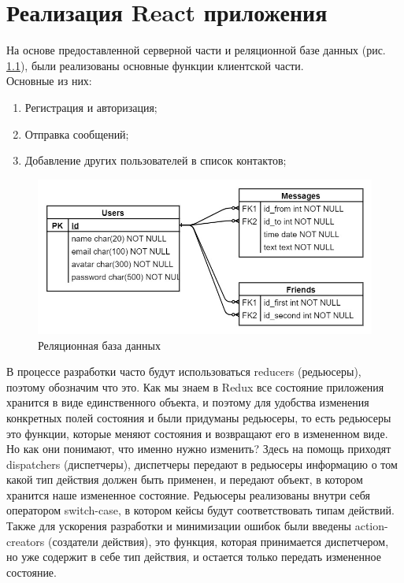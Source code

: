 \documentclass[14pt,final]{report}
\begin{document}
\chapter{Реализация React приложения}

На основе предоставленной серверной части и реляционной базе данных (рис. \ref{database}), были реализованы основные функции клиентской части. \\
Основные из них:
\begin{enumerate}
    \item Регистрация и авторизация;
    \item Отправка сообщений;
    \item Добавление других пользователей в список контактов;
\end{enumerate}

\begin{figure}[h]
\centering
\includegraphics[scale=0.4 ]{5CzTRFz5alk.jpg}
\caption{Реляционная база данных}
\label{database}
\end{figure}
В процессе разработки часто будут использоваться reducers \cite{mardan} (редьюсеры), поэтому обозначим
что это. Как мы знаем в Redux все состояние приложения хранится в виде единственного объекта, и поэтому для удобства изменения конкретных полей состояния и были придуманы редьюсеры, то есть редьюсеры это функции, которые меняют состояния и возвращают его в измененном виде. Но как они понимают, что именно нужно изменить? Здесь на помощь приходят dispatchers (диспетчеры), диспетчеры передают в редьюсеры информацию о том какой тип действия должен быть применен, и передают объект, в котором хранится наше измененное состояние. Редьюсеры реализованы внутри себя оператором switch-case, в котором кейсы будут соответствовать
типам действий. Также для ускорения разработки и минимизации ошибок были введены action-creators (создатели действия), это функция, которая принимается диспетчером, но уже содержит в себе тип действия, и остается только передать измененное состояние. \\
\end{document}

